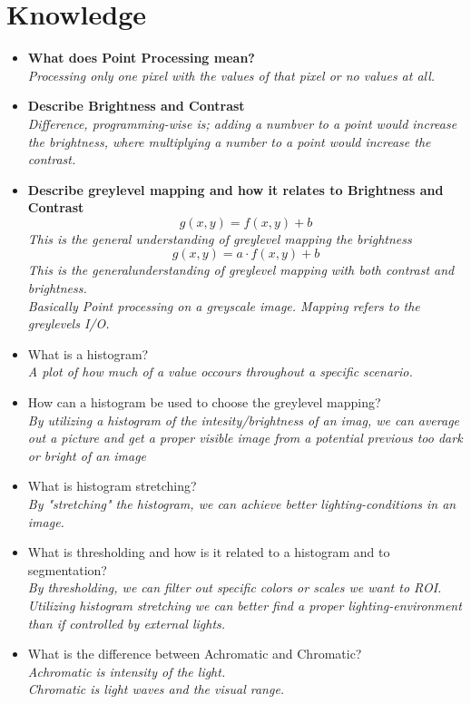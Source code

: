 \documentclass{article}
\begin{document}
\section{Knowledge}
\begin{itemize}
  \item \textbf{What does Point Processing mean?}\\
    \textit{Processing only one pixel with the values of that pixel or no values at all.}
  \item \textbf{Describe Brightness and Contrast}\\
    \textit{Difference, programming-wise is; adding a numbver to a point would increase the brightness, where multiplying a number to a point would increase the contrast.}
  \item \textbf{Describe greylevel mapping and how it relates to Brightness and Contrast}\\
    \textit{$$ g(x, y) = f(x, y) + b$$This is the general understanding of greylevel mapping the brightness $$g(x, y) = a \cdot f(x, y) + b$$This is the generalunderstanding of greylevel mapping with both contrast and brightness.\\Basically Point processing on a greyscale image. Mapping refers to the greylevels I/O.} 
   \item What is a histogram?\\
     \textit{A plot of how much of a value occours throughout a specific scenario.}
   \item How can a histogram be used to choose the greylevel mapping?\\
     \textit{By utilizing a histogram of the intesity/brightness of an imag, we can average out a picture and get a proper visible image from a potential previous too dark or bright of an image}
   \item What is histogram stretching?\\
     \textit{By "stretching" the histogram, we can achieve better lighting-conditions in an image.}
   \item What is thresholding and how is it related to a histogram and to segmentation?\\
     \textit{By thresholding, we can filter out specific colors or scales we want to ROI. Utilizing histogram stretching we can better find a proper lighting-environment than if controlled by external lights.}
   \item What is the difference between Achromatic and Chromatic?\\
     \textit{Achromatic is intensity of the light.\\Chromatic is light waves and the visual range.}

\end{itemize}
\end{document}
